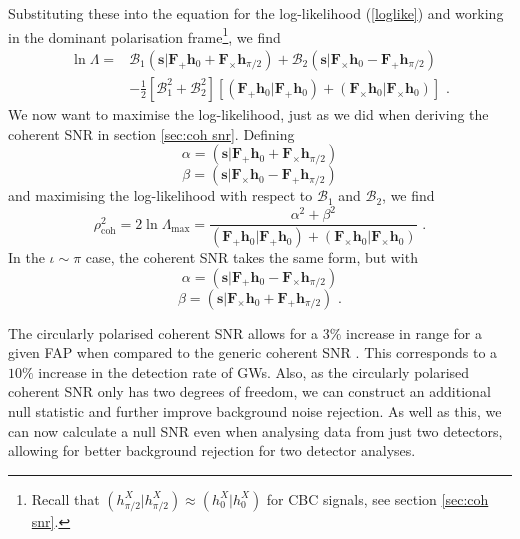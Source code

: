 \documentclass[11pt]{cuthesis}
\newcommand{\fs}{\text{ .}}
\begin{document}
Substituting these into the equation for the log-likelihood (\ref{loglike}) and working in the dominant polarisation frame\footnote{Recall that $(h_{\pi/2}^X|h_{\pi/2}^X)\approx (h_0^X|h_0^X)$ for CBC signals, see section \ref{sec:coh snr}.}, we find
\begin{align} 
\ln \Lambda = & \mathcal{B}_1 (\textbf{s}|\textbf{F}_+\textbf{h}_0 + \textbf{F}_\times \textbf{h}_{\pi /2} ) + \mathcal{B}_2  (\textbf{s}|\textbf{F}_\times\textbf{h}_0 - \textbf{F}_+ \textbf{h}_{\pi /2} ) \\ & - \frac{1}{2} [\mathcal{B}_1^2 + \mathcal{B}_2^2 ] [ (\textbf{F}_+\textbf{h}_0|\textbf{F}_+\textbf{h}_0) + (\textbf{F}_\times \textbf{h}_0|\textbf{F}_\times \textbf{h}_0) ] \fs
\end{align}
We now want to maximise the log-likelihood, just as we did when deriving the coherent SNR in section \ref{sec:coh snr}.  Defining 
\begin{equation}
\alpha = (\textbf{s}|\textbf{F}_+\textbf{h}_0 + \textbf{F}_\times \textbf{h}_{\pi /2} )
\end{equation}
\begin{equation}
\beta =  (\textbf{s}|\textbf{F}_\times\textbf{h}_0 - \textbf{F}_+ \textbf{h}_{\pi /2} ) 
\end{equation}
and maximising the log-likelihood with respect to $\mathcal{B}_1$ and $\mathcal{B}_2$, we find 
\begin{equation}
\rho_\text{coh}^2 = 2\ln \Lambda_\text{max} = \frac{\alpha^2 + \beta^2}{ (\textbf{F}_+\textbf{h}_0|\textbf{F}_+\textbf{h}_0) + (\textbf{F}_\times \textbf{h}_0|\textbf{F}_\times \textbf{h}_0)} \fs
\end{equation}
In the $\iota \sim \pi$ case, the coherent SNR takes the same form, but with
\begin{equation}
\alpha = (\textbf{s}|\textbf{F}_+\textbf{h}_0 - \textbf{F}_\times \textbf{h}_{\pi /2} )
\end{equation}
\begin{equation}
\beta =  (\textbf{s}|\textbf{F}_\times\textbf{h}_0 + \textbf{F}_+ \textbf{h}_{\pi /2} ) \fs
\end{equation}

The circularly polarised coherent SNR allows for a $3\%$ increase in range for a given FAP when compared to the generic coherent SNR \cite{pygrb_Williamson:2014}. This corresponds to a $10\%$ increase in the detection rate of GWs. Also, as the circularly polarised coherent SNR only has two degrees of freedom, we can construct an additional null statistic and further improve background noise rejection. As well as this, we can now calculate a null SNR even when analysing data from just two detectors, allowing for better background rejection for two detector analyses.
\end{document}
